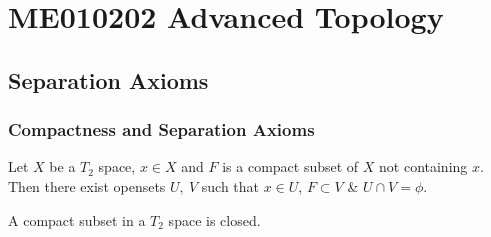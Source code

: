 

\part{ME010202 Advanced Topology}


\setcounter{chapter}{6}
\chapter{Separation Axioms}
\section{Compactness and Separation Axioms}
\begin{proposition}
	Let $X$ be a $T_2$ space, $x \in X$ and $F$ is a compact subset of $X$ not containing $x$. Then there exist opensets $U,\ V$ such that $x \in U$, $F \subset V$ \& $U \cap V = \phi$.
\end{proposition}

\begin{corollary}
	A compact subset in a $T_2$ space is closed.
\end{corollary}

